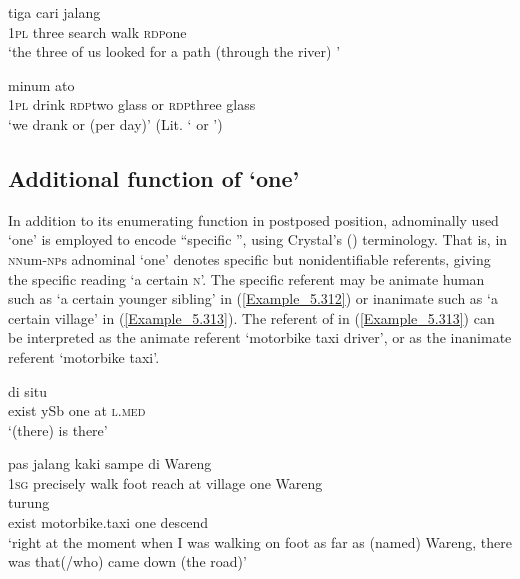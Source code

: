 \ea
\label{Example_5.310}
 {tiga} {cari} {jalang} {}\\ %
 \textsc{1pl}  three  search  walk  \textsc{rdp}{\Tilde}one\\
\glt 
‘the three of us looked for a path (through the river) ’ \textstyleExampleSource{[081013-003-Cv.0003]}
\z

\ea
\label{Example_5.311}
 {minum} {} {} {ato} {} {}\\ %
 \textsc{1pl}  drink  \textsc{rdp}{\Tilde}two  glass  or  \textsc{rdp}{\Tilde}three  glass\\
 ‘we drank  or  (per day)’ (Lit. ‘ or ’) \textstyleExampleSource{[081025-009a-Cv.0069]}
\z


\subsection{Additional function of  ‘one’}
\label{Para_5.9.4}
In addition to its enumerating function in postposed position, adnominally used  ‘one’ is employed to encode “specific ”, using Crystal’s (\citeyear*[444]{Crystal.2008}) terminology. That is, in \textsc{nn}um-\textsc{np}s adnominal  ‘one’ denotes specific but nonidentifiable referents, giving the specific  reading   ‘a certain \textsc{n}’. The specific  referent may be animate human such as  ‘a certain younger sibling’ in (\ref{Example_5.312}) or inanimate such as  ‘a certain village’ in (\ref{Example_5.313}). The referent of  in (\ref{Example_5.313}) can be interpreted as the animate referent ‘motorbike taxi driver’, or as the inanimate referent ‘motorbike taxi’.


\ea
\label{Example_5.312}
 {} {} {di} {situ}\\ %
 exist  ySb  one  at  \textsc{l.med}\\
\glt 
‘(there) is  there’ \textstyleExampleSource{[080922-004-Cv.0018]}
\z

\ea
\label{Example_5.313}
 {{pas}} {{jalang}} {{kaki}} {sampe} {di} {} {} {Wareng}\\ %
 \textsc{1sg}  {precisely}  {walk}  {foot}  reach  at  village  one  Wareng\\
   {}  {}  {turung}\\
 {exist}  {motorbike.taxi}  {one}  {descend}\\
\glt
‘right at the moment when I was walking on foot as far as  (named) Wareng, there was  that(/who) came down (the road)’ \textstyleExampleSource{[080923-010-CvNP.0001]}
\z


